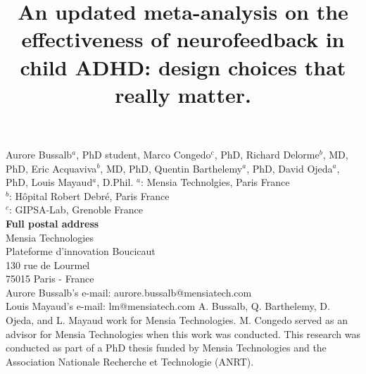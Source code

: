 

\title{An updated meta-analysis on the effectiveness of neurofeedback in child ADHD: design choices that really matter.} %
\maketitle
\noindent Aurore Bussalb$^a$, PhD student, Marco Congedo$^c$, PhD, Richard Delorme$^b$, MD, PhD, Eric Acquaviva$^b$, MD, PhD,
Quentin Barthelemy$^a$, PhD, David Ojeda$^a$, PhD, Louis Mayaud$^a$, D.Phil.
\smallbreak
\noindent $^a$: Mensia Technolgies, Paris France \\
\noindent $^b$: Hôpital Robert Debré, Paris France \\ %
\noindent $^c$: GIPSA-Lab, Grenoble France \\
\smallbreak
\noindent\textbf{Full postal address} \\
Mensia Technologies \\
Plateforme d'innovation Boucicaut \\
130 rue de Lourmel \\
75015 Paris - France \\
Aurore Bussalb's e-mail: aurore.bussalb@mensiatech.com \\
Louis Mayaud's e-mail: lm@mensiatech.com 
\smallbreak
A. Bussalb, Q. Barthelemy, D. Ojeda, and L. Mayaud work for Mensia Technologies.
M. Congedo served as an advisor for Mensia Technologies when this work was conducted. 
\smallbreak
This research was conducted as part of a PhD thesis funded by Mensia Technologies and the Association Nationale Recherche et Technologie (ANRT).

